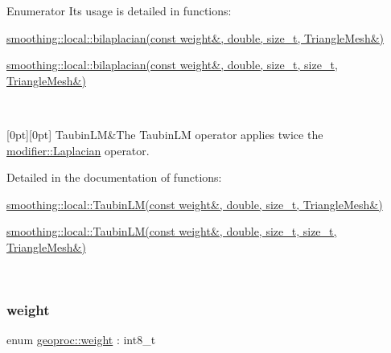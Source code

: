 \begin{DoxyEnumFields}{Enumerator}
Its usage is detailed in functions\+:
\begin{DoxyItemize}
\item \hyperlink{namespacegeoproc_1_1smoothing_1_1local_ae414b9bd00610e2f63096ab8c087b5ea}{smoothing\+::local\+::bilaplacian(const weight\&, double, size\+\_\+t, Triangle\+Mesh\&)}
\item \hyperlink{namespacegeoproc_1_1smoothing_1_1local_a57fc04667cb54871012f162f6af1deed}{smoothing\+::local\+::bilaplacian(const weight\&, double, size\+\_\+t, size\+\_\+t, Triangle\+Mesh\&)} 
\end{DoxyItemize}\\
\hline

[0pt][0pt]{}\mbox{\label{namespacegeoproc_a396280579199558902594f4df72c01c7ad69ec4945f39affa518f05fa077b00ae}} 
Taubin\+LM&The Taubin\+LM operator applies twice the \hyperlink{namespacegeoproc_a396280579199558902594f4df72c01c7a799723f39baf497704a3d39e7c03555f}{modifier\+::\+Laplacian} operator.

Detailed in the documentation of functions\+:
\begin{DoxyItemize}
\item \hyperlink{namespacegeoproc_1_1smoothing_1_1local_ac234b9f2b455e7dbc97b71bb6c9c47d3}{smoothing\+::local\+::\+Taubin\+L\+M(const weight\&, double, size\+\_\+t, Triangle\+Mesh\&)}
\item \hyperlink{namespacegeoproc_1_1smoothing_1_1local_a05133ca078331bc4fe3e95104c35d3af}{smoothing\+::local\+::\+Taubin\+L\+M(const weight\&, double, size\+\_\+t, size\+\_\+t, Triangle\+Mesh\&)} 
\end{DoxyItemize}\\
\hline

\end{DoxyEnumFields}
\mbox{\label{namespacegeoproc_a12e5a10581b53b9dd9a509127527f843}} 
\subsubsection{\texorpdfstring{weight}{weight}}
{\footnotesize\ttfamily enum \hyperlink{namespacegeoproc_a12e5a10581b53b9dd9a509127527f843}{geoproc\+::weight} \+: int8\+\_\+t\hspace{0.3cm}{\ttfamily [strong]}}



